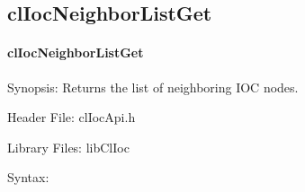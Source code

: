 \begin{flushleft}
\newpage

\subsection{clIocNeighborListGet}
\hypertarget{pageIOC123}{}\paragraph{cl\-Ioc\-Neighbor\-List\-Get}\label{pageIOC123}
\begin{Desc}
\item[Synopsis: ]Returns the list of neighboring IOC nodes.\end{Desc}
\begin{Desc}
\item[Header File:]clIocApi.h\end{Desc}
\begin{Desc}
\item[Library Files:]libClIoc\end{Desc}
\begin{Desc}
\item[Syntax: ]


\end{Desc}
\end{flushleft}
